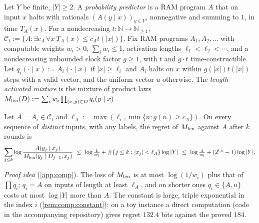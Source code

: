\begin{definition}\label{def:comp:timebounded}
Let $Y$ be finite, $|Y|\ge2$. A \emph{probability predictor} is a RAM program $A$ that on input $x$ halts with rationals $(A(y\mid x))_{y\in Y}$, nonnegative and summing to $1$, in time $T_A(x)$. For a nondecreasing $t:\mathbb N\to\mathbb N_{\ge1}$, $\mathcal C_t:=\{A:\exists c_A\,\forall x\ T_A(x)\le c_At(|x|)\}$. Fix RAM programs $A_1,A_2,\dots$ with computable weights $w_i>0$, $\sum_iw_i\le1$, activation lengths $\ell_1<\ell_2<\cdots$, and a nondecreasing unbounded clock factor $g\ge1$, with $t$ and $g\cdot t$ time-constructible. Let $q_i(\cdot\mid x):=A_i(\cdot\mid x)$ if $|x|\ge\ell_i$ and $A_i$ halts on $x$ within $g(|x|)t(|x|)$ steps with a valid vector, and the uniform vector $u$ otherwise. The \emph{length-activated mixture} is the mixture of product laws $M_{\mathrm{len}}(D):=\sum_iw_i\prod_{(x,y)\in D}q_i(y\mid x)$.
\end{definition}

\begin{theorem}\label{thm:comp:timebounded}
Let $A=A_i\in\mathcal C_t$ and $\ell_A:=\max(\ell_i,\min\{n:g(n)\ge c_A\})$. On every sequence of \emph{distinct} inputs, with any labels, the regret of $M_{\mathrm{len}}$ against $A$ after $k$ rounds is
\[ \sum_{j\le k}\log\frac{A(y_j\mid x_j)}{\Mlen(y_j\mid D_{j-1},x_j)}\ \le\ \log\tfrac1{w_i}+\#\{j\le k:|x_j|<\ell_A\}\log|Y|\ \le\ \log\tfrac1{w_i}+(2^{\ell_A}-1)\log|Y|. \]
\end{theorem}

\emph{Proof idea} (\cref{app:comp}). The loss of $M_{\mathrm{len}}$ is at most $\log(1/w_i)$ plus that of $\prod q_i$; $q_i=A$ on inputs of length at least $\ell_A$, and on shorter ones $q_i\in\{A,u\}$ costs at most $\log|Y|$ more than $A$. The constant is large, triple exponential in the index $i$ (\cref{rem:comp:constant}); on a toy instance a direct computation (code in the accompanying repository) gives regret $132.4$ bits against the proved $184$.

